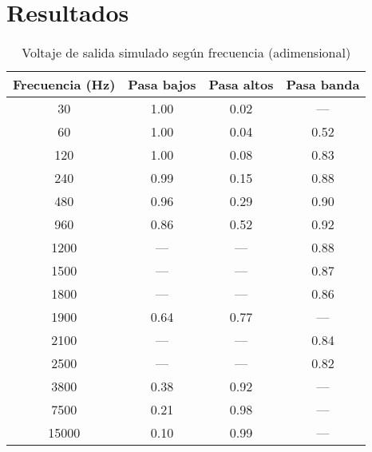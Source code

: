 \section{Resultados}


\begin{table}[H]
  \centering
  \caption{Voltaje de salida simulado según frecuencia (adimensional)}
  \label{tab:filtros}
  \begin{tabular}{cccc}
    \toprule
    \textbf{Frecuencia (Hz)} & \textbf{Pasa bajos} & \textbf{Pasa altos} & \textbf{Pasa banda} \\
    \midrule
    30     & 1.00 & 0.02 & ---   \\
    60     & 1.00 & 0.04 & 0.52 \\
    120    & 1.00 & 0.08 & 0.83 \\
    240    & 0.99 & 0.15 & 0.88 \\
    480    & 0.96 & 0.29 & 0.90 \\
    960    & 0.86 & 0.52 & 0.92 \\
    1200   & ---   & ---   & 0.88 \\
    1500   & ---   & ---   & 0.87 \\
    1800   & ---   & ---   & 0.86 \\
    1900   & 0.64 & 0.77 & ---   \\
    2100   & ---   & ---   & 0.84 \\
    2500   & ---   & ---   & 0.82 \\
    3800   & 0.38 & 0.92 & ---   \\
    7500   & 0.21 & 0.98 & ---   \\
    15000  & 0.10 & 0.99 & ---   \\
    \bottomrule
  \end{tabular}
\end{table}

